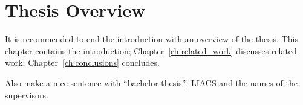 \section{Thesis Overview}
It is recommended to end the introduction with an overview of the thesis. This chapter contains the introduction; Chapter~\ref{ch:related_work} discusses related work; Chapter~\ref{ch:conclusions} concludes.

Also make a nice sentence with ``bachelor thesis'', LIACS and the names of the supervisors.
